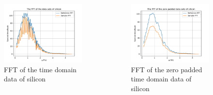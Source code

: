 \documentclass[aspectratio=1610, 9pt]{beamer}
\begin{document}
\begin{frame}
  \begin{center}
    \begin{columns}
      \begin{column}{0.5\textwidth}
        \begin{figure}
        \includegraphics[width=\textwidth]{silicon/THz_FFT.pdf}
        \caption{FFT of the time domain data of silicon}
        \end{figure}
      \end{column}
      \begin{column}{0.5\textwidth}
        \begin{figure}
        \includegraphics[width=\textwidth]{silicon/THz_FFT_zero.pdf}
        \caption{FFT of the zero padded time domain data of silicon}
        \end{figure}
      \end{column}
    \end{columns}
  \end{center}
\end{frame}
\end{document}
